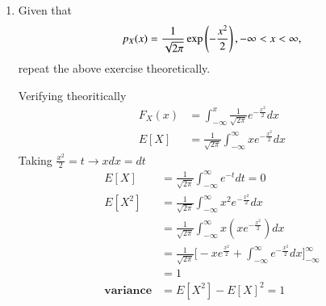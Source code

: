 \documentclass[journal,12pt,twocolumn]{IEEEtran}
\renewcommand\thesection{\arabic{section}}
\begin{document}
\begin{enumerate}[label=\thesection.\arabic*
,ref=\thesection.\theenumi]
\item Given that 
\begin{align}
p_{X}(x) = \frac{1}{\sqrt{2\pi}}\exp\left(-\frac{x^2}{2}\right), -\infty < x < \infty,
\end{align}
repeat the above exercise theoretically.

\solution Verifying theoritically
    \begin{align}
        F_X(x) &= \int_{-\infty}^{x}\frac{1}{\sqrt{2\pi}}e^{-\frac{x^2}{2}}dx \\
        E[X]&= \frac{1}{\sqrt{2\pi}} \int_{-\infty}^{\infty}xe^{-\frac{x^2}{2}}dx 
    \end{align}
    Taking $\frac{x^2}{2} = t \rightarrow xdx = dt$
    \begin{align}
        E[X]&= \frac{1}{\sqrt{2\pi}} \int_{-\infty}^{\infty}e^{-t} dt = 0 \\
        E[X^2]&= \frac{1}{\sqrt{2\pi}} \int_{-\infty}^{\infty}x^2e^{-\frac{x^2}{2}}dx \\
        &= \frac{1}{\sqrt{2\pi}} \int_{-\infty}^{\infty}x(xe^{-\frac{x^2}{2}})dx \\
        &= \frac{1}{\sqrt{2\pi}} \bigg[-xe^{\frac{x^2}{2}}+\int_{-\infty}^{\infty}e^{-\frac{x^2}{2}} dx \bigg]_{-\infty}^{\infty} \\
        &= 1 \\
        \textbf{variance} &= E[X^2] - E[X]^2 = 1
    \end{align}
\end{enumerate}
\end{document}
